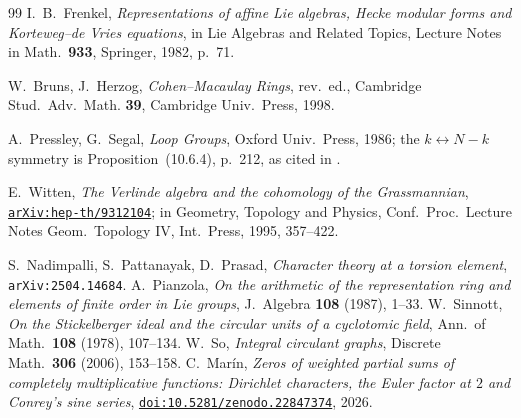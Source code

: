 \documentclass[11pt,a4paper]{article}
\theoremstyle{definition}
\begin{document}
\begin{thebibliography}{99}
 I.~B.~Frenkel, \emph{Representations of affine Lie algebras, Hecke modular forms and
Korteweg--de Vries equations}, in Lie Algebras and Related Topics, Lecture Notes in
Math.~\textbf{933}, Springer, 1982, p.~71.

 W.~Bruns, J.~Herzog, \emph{Cohen--Macaulay Rings}, rev.~ed., Cambridge Stud.~Adv.~Math.
\textbf{39}, Cambridge Univ.~Press, 1998.

 A.~Pressley, G.~Segal, \emph{Loop Groups}, Oxford Univ.~Press, 1986; the
$k\leftrightarrow N-k$ symmetry is Proposition~(10.6.4), p.~212, as cited in \cite{Wit93}.

 E.~Witten, \emph{The Verlinde algebra and the cohomology of the Grassmannian},
\href{https://arxiv.org/abs/hep-th/9312104}{\texttt{arXiv:hep-th/9312104}}; in Geometry, Topology
and Physics, Conf.~Proc.~Lecture Notes Geom.~Topology IV, Int.~Press, 1995, 357--422.

 S.~Nadimpalli, S.~Pattanayak, D.~Prasad, \emph{Character theory at a torsion element},
\texttt{arXiv:2504.14684}.
 A.~Pianzola, \emph{On the arithmetic of the representation ring and elements of
finite order in Lie groups}, J.~Algebra \textbf{108} (1987), 1--33.
 W.~Sinnott, \emph{On the Stickelberger ideal and the circular units of a cyclotomic
field}, Ann.~of Math.~\textbf{108} (1978), 107--134.
 W.~So, \emph{Integral circulant graphs}, Discrete Math.~\textbf{306} (2006), 153--158.
 C.~Mar\'in, \emph{Zeros of weighted partial sums of completely multiplicative
functions: Dirichlet characters, the Euler factor at $2$ and Conrey's sine series},
\href{https://doi.org/10.5281/zenodo.22847374}{\texttt{doi:10.5281/zenodo.22847374}}, 2026.

\end{thebibliography}
\end{document}
